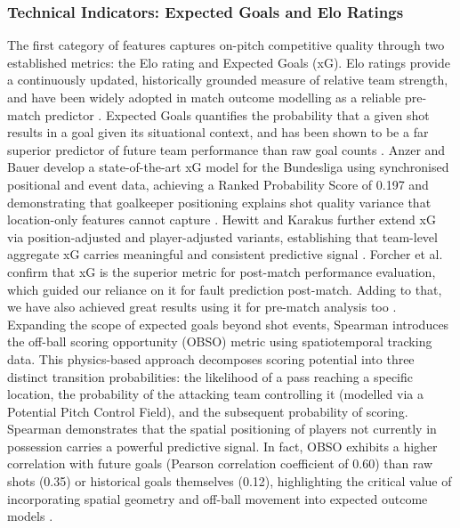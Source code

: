 \documentclass[a4paper,twoside]{article}
\begin{document}
\subsubsection*{Technical Indicators: Expected Goals and Elo Ratings}
The first category of features captures on-pitch competitive quality through two established metrics: the Elo rating and Expected Goals (xG).
Elo ratings provide a continuously updated, historically grounded measure of relative team strength, and have been widely adopted in match outcome modelling as a reliable pre-match predictor \cite{tsokos_modeling_2019}.
Expected Goals quantifies the probability that a given shot results in a goal given its situational context, and has been shown to be a far superior predictor of future team performance than raw goal counts \cite{mead_expected_2023}.
Anzer and Bauer develop a state-of-the-art xG model for the Bundesliga using synchronised positional and event data, achieving a Ranked Probability Score of 0.197 and demonstrating that goalkeeper positioning explains shot quality variance that location-only features cannot capture \cite{anzer_goal_2021}.
Hewitt and Karakus further extend xG via position-adjusted and player-adjusted variants, establishing that team-level aggregate xG carries meaningful and consistent predictive signal \cite{hewitt_machine_2023}.
Forcher et al. confirm that xG is the superior metric for post-match performance evaluation, which guided our reliance on it for fault prediction post-match. Adding to that, we have also achieved great results using it for pre-match analysis too \cite{forcher_ai_2025}.
Expanding the scope of expected goals beyond shot events, Spearman introduces the off-ball scoring opportunity (OBSO) metric using spatiotemporal tracking data. This physics-based approach decomposes scoring potential into three distinct transition probabilities: the likelihood of a pass reaching a specific location, the probability of the attacking team controlling it (modelled via a Potential Pitch Control Field), and the subsequent probability of scoring. Spearman demonstrates that the spatial positioning of players not currently in possession carries a powerful predictive signal. In fact, OBSO exhibits a higher correlation with future goals (Pearson correlation coefficient of 0.60) than raw shots (0.35) or historical goals themselves (0.12), highlighting the critical value of incorporating spatial geometry and off-ball movement into expected outcome models \cite{spearman2018beyond}.
\end{document}
